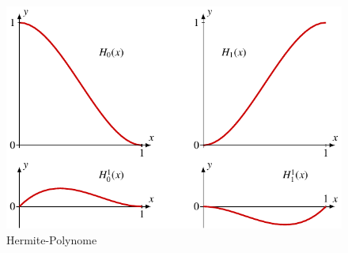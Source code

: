 %
%
%
\begin{figure}
\centering
\includegraphics{chapters/030-nichtdiff/images/hermite.pdf}
\caption{Hermite-Polynome
\label{buch:nichtdiff:splines:fig:hermitepolynome}}
\end{figure}
